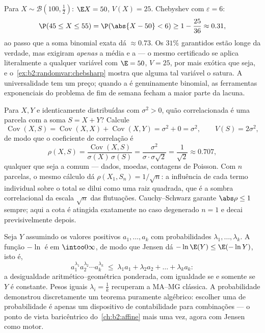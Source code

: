 \begin{example}\label{ex:b2:randomvar:hundredtosses}
Para $X \sim \mathcal B(100, \frac12)$: $\E X = 50$, $V(X) =
25$. Chebyshev com $\varepsilon = 6$:
\[
\P(45 \leq X \leq 55) = \P(\abs{X - 50} < 6)
\geq 1 - \frac{25}{36} \approx 0.31 ,
\]
ao passo que a soma binomial exata dá $\approx 0.73$. Os
$31\%$ garantidos estão longe da verdade, mas exigiram
\emph{apenas} a média e a  --- o mesmo certificado
se aplica literalmente a qualquer variável com $\E = 50$, $V = 25$,
por mais exótica que seja, e o~\cref{ex:b2:randomvar:chebsharp} mostra
que alguma tal variável o satura. A universalidade tem um preço;
quando a  é genuinamente binomial, as ferramentas
exponenciais do problema de fim de semana fecham a maior parte da lacuna.
\end{example}

\begin{example}\label{ex:b2:randomvar:partwhole}
Para $X, Y$  e identicamente distribuídas com 
$\sigma^2 > 0$, quão correlacionada é uma parcela com a soma
$S = X + Y$? Calcule
\[
\operatorname{Cov}(X, S) = \operatorname{Cov}(X, X) +
\operatorname{Cov}(X, Y) = \sigma^2 + 0 = \sigma^2,
\qquad V(S) = 2\sigma^2,
\]
de modo que o coeficiente de correlação é
\[
\rho(X, S) = \frac{\operatorname{Cov}(X,
S)}{\sigma(X)\,\sigma(S)}
= \frac{\sigma^2}{\sigma\cdot\sigma\sqrt2}
= \frac{1}{\sqrt2} \approx 0.707 ,
\]
qualquer que seja a  comum --- dados, moedas, contagens de Poisson. Com
$n$ parcelas, o mesmo cálculo dá $\rho(X_1, S_n) =
1/\sqrt n$: a influência de cada termo individual sobre o total
se dilui como uma raiz quadrada, que é a sombra correlacional
da escala $\sqrt n$ das flutuações. Cauchy--Schwarz
garante $\abs\rho \leq 1$ sempre; aqui a cota é atingida
exatamente no caso degenerado $n = 1$ e decai previsivelmente
depois.
\end{example}

\begin{example}\label{ex:b2:randomvar:amgm}
Seja $Y$ assumindo os valores positivos $a_1, \dots, a_k$ com
probabilidades $\lambda_1, \dots, \lambda_k$. A função
$-\ln$ é  em $\intoo0\infty$, de modo que Jensen dá
$-\ln\E(Y) \leq \E(-\ln Y)$, isto é,
\[
a_1^{\lambda_1}a_2^{\lambda_2}\cdots a_k^{\lambda_k}
\;\leq\; \lambda_1a_1 + \lambda_2a_2 + \dots + \lambda_ka_k :
\]
a desigualdade aritmético--geométrica ponderada, com igualdade
se e somente se $Y$ é constante. Pesos iguais $\lambda_i = \frac1k$
recuperam a MA--MG clássica. A probabilidade demonstrou discretamente
um teorema puramente algébrico: escolher uma  de probabilidade é
apenas um dispositivo de contabilidade para combinações  --- o
ponto de vista baricêntrico do~\cref{ch:b2:affine} mais uma vez, agora
com Jensen como motor.
\end{example}

